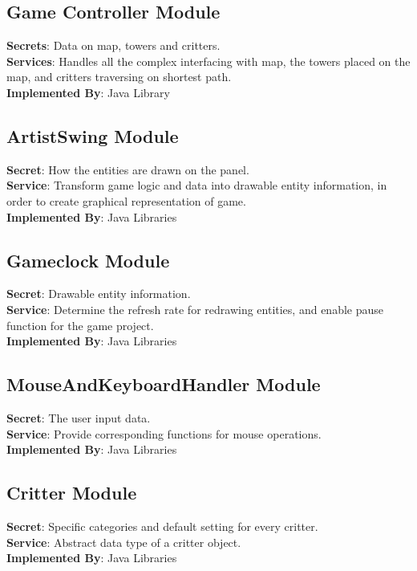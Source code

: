 \documentclass[12,english]{article}
\begin{document}
	\subsection{Game Controller Module}
	\textbf{Secrets}: Data on map, towers and critters. \\
	\textbf{Services}: Handles all the complex interfacing with map, the towers placed on the map, and critters traversing on shortest path. \\
	\textbf{Implemented By}: Java Library \\
	
	\subsection{ArtistSwing Module}
	\textbf{Secret}: How the entities are drawn on the panel.  \\
	\textbf{Service}: Transform game logic and data into drawable entity information, in order to create graphical representation of game.   \\  
	\textbf{Implemented By}: Java Libraries \\

	\subsection{Gameclock Module}
	\textbf{Secret}: Drawable entity information. \\
	\textbf{Service}: Determine the refresh rate for redrawing entities, and enable pause function for the game project. \\
	\textbf{Implemented By}: Java Libraries\\

	\subsection{MouseAndKeyboardHandler Module}
	\textbf{Secret}: The user input data. \\
	\textbf{Service}: Provide corresponding functions for mouse operations. \\
	\textbf{Implemented By}: Java Libraries\\ 
	
	\subsection{Critter Module}
	\textbf{Secret}: Specific categories and default setting for every critter. \\
	\textbf{Service}: Abstract data type of a critter object. \\
	\textbf{Implemented By}: Java Libraries\\
\end{document}

